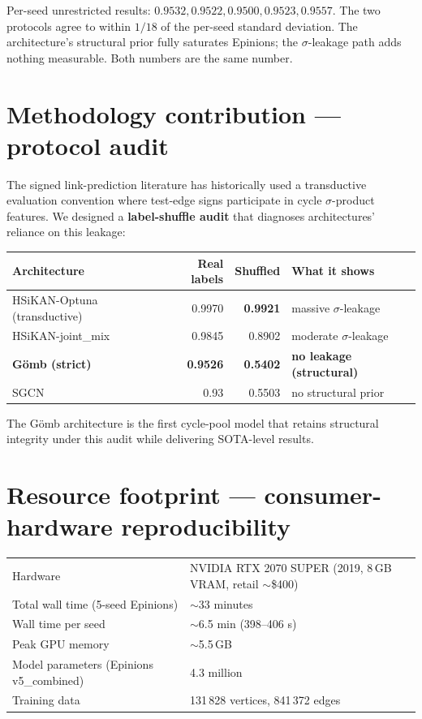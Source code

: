 \documentclass[11pt,a4paper]{article}
\newcommand{\sig}{\ensuremath{\sigma}}
\begin{document}
Per-seed unrestricted results: $0.9532, 0.9522, 0.9500, 0.9523,
0.9557$. The two protocols agree to within $1/18$ of the
per-seed standard deviation. The architecture's structural prior
fully saturates Epinions; the \sig-leakage path adds nothing
measurable. Both numbers are the same number.

\section{Methodology contribution --- protocol audit}

The signed link-prediction literature has historically used a
transductive evaluation convention where test-edge signs
participate in cycle \sig-product features. We designed a
\textbf{label-shuffle audit} that diagnoses architectures' reliance
on this leakage:

\begin{center}
\begin{tabular}{lrrl}
\toprule
\textbf{Architecture} & \textbf{Real labels} & \textbf{Shuffled} & \textbf{What it shows} \\
\midrule
HSiKAN-Optuna (transductive)  & 0.9970 & \textbf{0.9921} & massive \sig-leakage \\
HSiKAN-joint\_mix             & 0.9845 & 0.8902 & moderate \sig-leakage \\
\textbf{G\"omb (strict)}      & \textbf{0.9526} & \textbf{0.5402} & \textbf{no leakage (structural)} \\
SGCN                          & 0.93   & 0.5503 & no structural prior \\
\bottomrule
\end{tabular}
\end{center}

The G\"omb architecture is the first cycle-pool model that retains
structural integrity under this audit while delivering SOTA-level
results.

\section{Resource footprint — consumer-hardware reproducibility}

\begin{center}
\begin{tabular}{ll}
\toprule
Hardware & NVIDIA RTX 2070 SUPER (2019, 8\,GB VRAM, retail $\sim$\$400) \\
Total wall time (5-seed Epinions) & $\sim$33 minutes \\
Wall time per seed & $\sim$6.5 min (398--406 s) \\
Peak GPU memory & $\sim$5.5\,GB \\
Model parameters (Epinions v5\_combined) & 4.3 million \\
Training data & 131\,828 vertices, 841\,372 edges \\
\bottomrule
\end{tabular}
\end{center}
\end{document}
